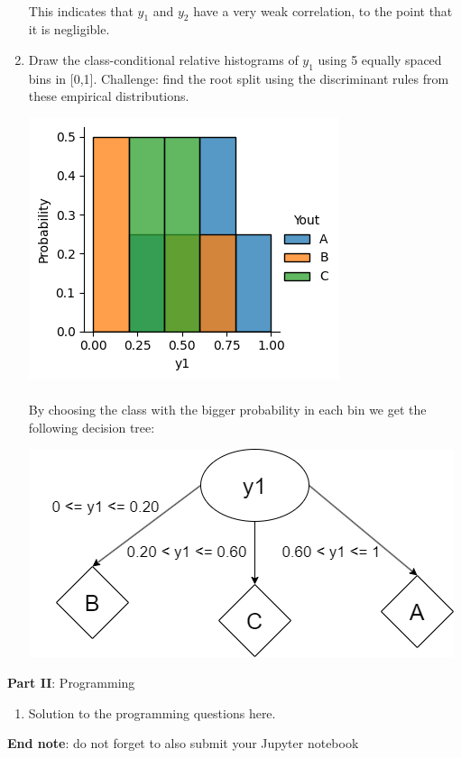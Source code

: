 \documentclass[12pt]{article}
\begin{document}
\begin{enumerate}[leftmargin=\labelsep]
    \paragraph{}This indicates that $y_1$ and $y_2$ have a very weak correlation, to the point that it is negligible.

    \item Draw the class-conditional relative histograms of $y_1$ using 5 equally spaced bins in [0,1].
    Challenge: find the root split using the discriminant rules from these empirical distributions.    

    \begin{center}
        \includegraphics[scale=1]{images/histogram.png}
    \end{center}

    \paragraph{} By choosing the class with the bigger probability in each bin we get the following decision tree:

    \begin{center}
        \includegraphics[scale=0.5]{images/small-decision-tree.png}
    \end{center}

\end{enumerate}

\large{\textbf{Part II}: Programming}\normalsize

\begin{enumerate}[leftmargin=\labelsep,resume]
\item Solution to the programming questions here.
\end{enumerate}

\vskip 1cm
\textbf{End note}: do not forget to also submit your Jupyter notebook
\end{document}
